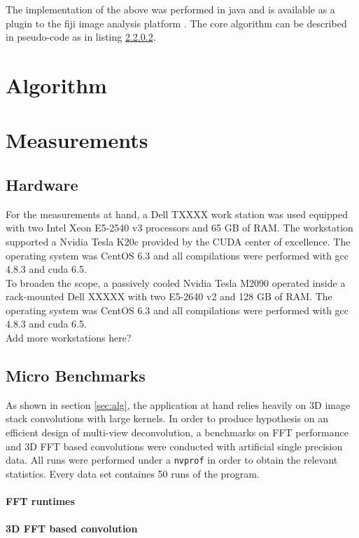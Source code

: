 \documentclass [12pt]{article}
\begin{document}
The implementation of the above was performed in java \cite{fiji_wiki_mvd} and is available as a plugin to the fiji image analysis platform \cite{fiji_website}. The core algorithm can be described in pseudo-code as in listing \ref{}.


\section[sec:alg]{Algorithm}
\section{Measurements}

\subsection{Hardware}
For the measurements at hand, a Dell TXXXX work station was used equipped with two Intel Xeon E5-2540 v3 processors and 65 GB of RAM. The workstation supported a Nvidia Tesla K20c provided by the CUDA center of excellence. The operating system was CentOS 6.3 and all compilations were performed with gcc 4.8.3 and cuda 6.5.\\ 
To broaden the scope, a passively cooled Nvidia Tesla M2090 operated inside a rack-mounted Dell XXXXX with two E5-2640 v2 and 128 GB of RAM. The operating system was CentOS 6.3 and all compilations were performed with gcc 4.8.3 and cuda 6.5.\\
 Add more workstations here?
\subsection{Micro Benchmarks}

As shown in section \ref{sec:alg}, the application at hand relies heavily on 3D image stack convolutions with large kernels. In order to produce hypothesis on an efficient design of multi-view deconvolution, a benchmarks on FFT performance and 3D FFT based convolutions were conducted with artificial single precision data. All runs were performed under a \texttt{nvprof} in order to obtain the relevant statistics. Every data set containes 50 runs of the program. 

\paragraph{FFT runtimes}

\paragraph{3D FFT based convolution}
\end{document}
